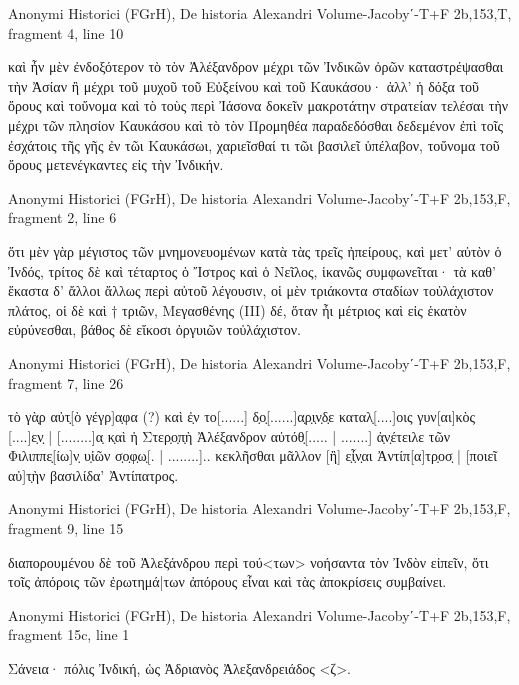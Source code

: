 \documentclass[12pt,letterpaper,twoside,final]{memoir}
\begin{document}
\begin{greek}
Anonymi Historici (FGrH), De historia Alexandri 
Volume-Jacobyʹ-T+F 2b,153,T, fragment 4, line 10

                                                                                     καὶ ἦν 
μὲν ἐνδοξότερον τὸ τὸν Ἀλέξανδρον μέχρι τῶν Ἰνδικῶν ὀρῶν καταστρέψασθαι τὴν 
Ἀσίαν ἢ μέχρι τοῦ μυχοῦ τοῦ Εὐξείνου καὶ τοῦ Καυκάσου· ἀλλ' ἡ δόξα τοῦ ὄρους 
καὶ τοὔνομα καὶ τὸ τοὺς περὶ Ἰάσονα δοκεῖν μακροτάτην στρατείαν τελέσαι τὴν 
μέχρι τῶν πλησίον Καυκάσου καὶ τὸ τὸν Προμηθέα παραδεδόσθαι δεδεμένον ἐπὶ 
τοῖς ἐσχάτοις τῆς γῆς ἐν τῶι Καυκάσωι, χαριεῖσθαί τι τῶι βασιλεῖ ὑπέλαβον, τοὔνομα 
τοῦ ὄρους μετενέγκαντες εἰς τὴν Ἰνδικήν. 



Anonymi Historici (FGrH), De historia Alexandri 
Volume-Jacobyʹ-T+F 2b,153,F, fragment 2, line 6

                              ὅτι μὲν γὰρ μέγιστος τῶν μνημονευομένων κατὰ τὰς τρεῖς 
ἠπείρους, καὶ μετ' αὐτὸν ὁ Ἰνδός, τρίτος δὲ καὶ τέταρτος ὁ Ἴστρος καὶ ὁ Νεῖλος, 
ἱκανῶς συμφωνεῖται· τὰ καθ' ἕκαστα δ' ἄλλοι ἄλλως περὶ αὐτοῦ λέγουσιν, οἱ μὲν 
τριάκοντα σταδίων τοὐλάχιστον πλάτος, οἱ δὲ καὶ † τριῶν, Μεγασθένης (III) δέ, 
ὅταν ἦι μέτριος καὶ εἰς ἑκατὸν εὐρύνεσθαι, βάθος δὲ εἴκοσι ὀργυιῶν τοὐλάχιστον. 



Anonymi Historici (FGrH), De historia Alexandri 
Volume-Jacobyʹ-T+F 2b,153,F, fragment 7, line 26

                                                  τὸ γὰ̣ρ αὐτ̣[ὸ γέγρ]α̣φα (?) καὶ ἐ̣ν το[......] 
δ̣ο̣[......]α̣ρ̣ι̣ν̣δ̣ε καταλ̣[....]οις γυν[αι]κὸς [....]ε̣ν̣ | [........]α̣ κ̣αὶ ἡ Στερ̣ο̣π̣ὴ 
Ἀλέξανδρον αὐτόθ̣[..... | .......] ἀ̣ν̣έτειλε τῶν Φιλιππε̣[ίω]ν̣ υ̣ἱῶν σ̣ο̣φ̣ω̣[. | ........].. 
κεκλῆσθαι μᾶλλον [ἢ] ε̣ἶ̣ν̣αι Ἀντίπ[α]τρ̣οσ̣ | [ποιεῖ αὐ]τ̣ὴν βασιλίδα’ Ἀντίπατρος. 



Anonymi Historici (FGrH), De historia Alexandri 
Volume-Jacobyʹ-T+F 2b,153,F, fragment 9, line 15

                                   διαπορουμένου δὲ τοῦ Ἀλεξάνδρου περὶ τού<των> 
νοήσαντα τὸν Ἰνδὸν εἰπεῖν, ὅτι τοῖς ἀπόροις τῶν ἐρωτημά|των ἀπόρους εἶναι καὶ 
τὰς ἀποκρίσεις συμβαίνει. 



Anonymi Historici (FGrH), De historia Alexandri 
Volume-Jacobyʹ-T+F 2b,153,F, fragment 15c, line 1

          Σάνεια· πόλις Ἰνδική, ὡς Ἀδριανὸς Ἀλεξανδρειάδος <ζ>. 



\end{greek}
\end{document}
